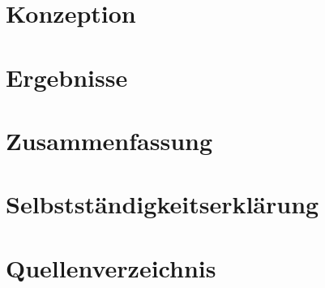 \documentclass[a4paper, 12pt]{article}
\begin{document}

\section{Konzeption}
\label{sec:Konzeption}


\section{Ergebnisse}
\label{sec:Ergebnisse}


\section{Zusammenfassung}
\label{sec:Zusammenfassung}


\newpage
\section{Selbstständigkeitserklärung}

\newpage
\section{Quellenverzeichnis}
%
\printbibliography[keyword={internet},title={Internetseiten?}]
\newpage
\printbibliography[keyword={buch},title={Literatur}]
\end{document}
